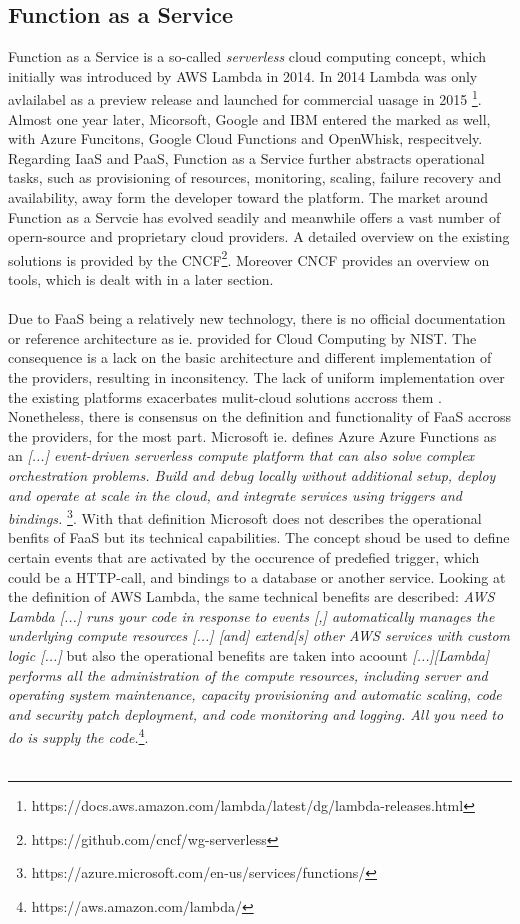 \documentclass[11pt]{article}
\begin{document}
\subsection{Function as a Service}
Function as a Service is a so-called \textit{serverless} cloud computing concept, which initially was introduced by AWS Lambda in 2014. In 2014 Lambda was only avlailabel as a preview release and launched for commercial uasage in 2015 \footnote{https://docs.aws.amazon.com/lambda/latest/dg/lambda-releases.html}. Almost one year later, Micorsoft, Google and IBM entered the marked as well, with Azure Funcitons, Google Cloud Functions and OpenWhisk, respecitvely. Regarding IaaS and PaaS, Function as a Service further abstracts operational tasks, such as provisioning of resources, monitoring, scaling, failure recovery and availability, away form the developer toward the platform. The market around Function as a Servcie has evolved seadily and meanwhile offers a vast number of opern-source and proprietary cloud providers. A detailed overview on the existing solutions is provided by the CNCF\footnote{https://github.com/cncf/wg-serverless}. Moreover CNCF provides an overview on tools, which is dealt with in a later section.\\\\ 
Due to FaaS being a relatively new technology, there is no official documentation or reference architecture as ie. provided for Cloud Computing by NIST. The consequence is a lack on the basic architecture and different implementation of the providers, resulting in inconsitency. The lack of uniform implementation over the existing platforms exacerbates mulit-cloud solutions accross them \cite{mell2011nist}. Nonetheless, there is consensus on the definition and functionality of FaaS accross the providers, for the most part. Microsoft ie. defines Azure Azure Functions as an \glqq \textit{[...] event-driven serverless compute platform that can also solve complex orchestration problems. Build and debug locally without additional setup, deploy and operate at scale in the cloud, and integrate services using triggers and bindings.} \grqq{}\footnote{https://azure.microsoft.com/en-us/services/functions/}. With that definition Microsoft does not describes the operational benfits of FaaS but its technical capabilities. The concept shoud be used to define certain events that are activated by the occurence of predefied trigger, which could be a HTTP-call, and bindings to a database or another service. Looking at the definition of AWS Lambda, the same technical benefits are described: \glqq \textit{AWS Lambda [...] runs your code in response to events [,] automatically manages the underlying compute resources [...] [and] extend[s] other AWS services with custom logic [...]}\grqq{} but also the operational benefits are taken into acoount \glqq \textit{[...][Lambda] performs all the administration of the compute resources, including server and operating system maintenance, capacity provisioning and automatic scaling, code and security patch deployment, and code monitoring and logging. All you need to do is supply the code.}\grqq{}\footnote{https://aws.amazon.com/lambda/}.\\\\
\end{document}

